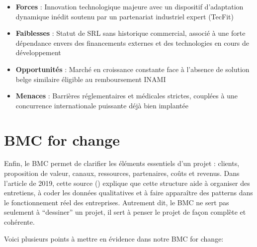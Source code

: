 \begin{itemize}
    \item \textbf{Forces} : Innovation technologique majeure avec un dispositif d'adaptation dynamique inédit soutenu par un partenariat industriel expert (TecFit)
    \item \textbf{Faiblesses} : Statut de SRL sans historique commercial, associé à une forte dépendance envers des financements externes et des technologies en cours de développement
    \item \textbf{Opportunités} : Marché en croissance constante face à l'absence de solution belge similaire éligible au remboursement INAMI
    \item \textbf{Menaces} : Barrières réglementaires et médicales strictes, couplées à une concurrence internationale puissante déjà bien implantée
  
\end{itemize}


\section{BMC for change}

Enfin, le BMC permet de clarifier les éléments essentiels d’un projet : clients, proposition de valeur, canaux, ressources, partenaires, coûts et revenus. Dans l’article de 2019, cette source (\cite{ref:bmc2}) explique que cette structure aide à organiser des entretiens, à coder les données qualitatives et à faire apparaître des patterns dans le fonctionnement réel des entreprises. Autrement dit, le BMC ne sert pas seulement à “dessiner” un projet, il sert à penser le projet de façon complète et cohérente.

Voici plusieurs points à mettre en évidence dans notre BMC for change:

